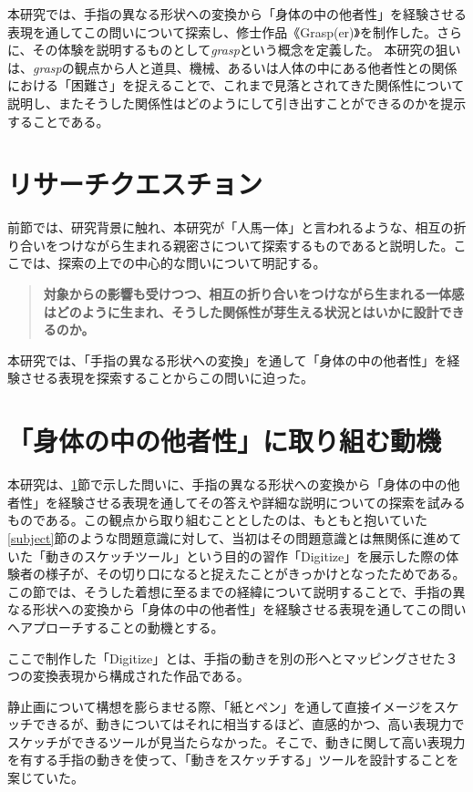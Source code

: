 本研究では、手指の異なる形状への変換から「身体の中の他者性」を経験させる表現を通してこの問いについて探索し、修士作品《Grasp(er)》を制作した。さらに、その体験を説明するものとして\textit{grasp}という概念を定義した。
本研究の狙いは、\textit{grasp}の観点から人と道具、機械、あるいは人体の中にある他者性との関係における「困難さ」を捉えることで、これまで見落とされてきた関係性について説明し、またそうした関係性はどのようにして引き出すことができるのかを提示することである。

\section{リサーチクエスチョン}
\label{research_question}
前節では、研究背景に触れ、本研究が「人馬一体」と言われるような、相互の折り合いをつけながら生まれる親密さについて探索するものであると説明した。ここでは、探索の上での中心的な問いについて明記する。

\begin{quote}
\textbf{対象からの影響も受けつつ、相互の折り合いをつけながら生まれる一体感はどのように生まれ、そうした関係性が芽生える状況とはいかに設計できるのか。}
\end{quote}

本研究では、「手指の異なる形状への変換」を通して「身体の中の他者性」を経験させる表現を探索することからこの問いに迫った。

\section{「身体の中の他者性」に取り組む動機}
\label{prototyping_concept_making}
本研究は、\ref{research_question}節で示した問いに、手指の異なる形状への変換から「身体の中の他者性」を経験させる表現を通してその答えや詳細な説明についての探索を試みるものである。この観点から取り組むこととしたのは、もともと抱いていた\ref{subject}節のような問題意識に対して、当初はその問題意識とは無関係に進めていた「動きのスケッチツール」という目的の習作「Digitize」を展示した際の体験者の様子が、その切り口になると捉えたことがきっかけとなったためである。
この節では、そうした着想に至るまでの経緯について説明することで、手指の異なる形状への変換から「身体の中の他者性」を経験させる表現を通してこの問いへアプローチすることの動機とする。

ここで制作した「Digitize」とは、手指の動きを別の形へとマッピングさせた３つの変換表現から構成された作品である。

静止画について構想を膨らませる際、「紙とペン」を通して直接イメージをスケッチできるが、動きについてはそれに相当するほど、直感的かつ、高い表現力でスケッチができるツールが見当たらなかった。そこで、動きに関して高い表現力を有する手指の動きを使って、「動きをスケッチする」ツールを設計することを案じていた。

